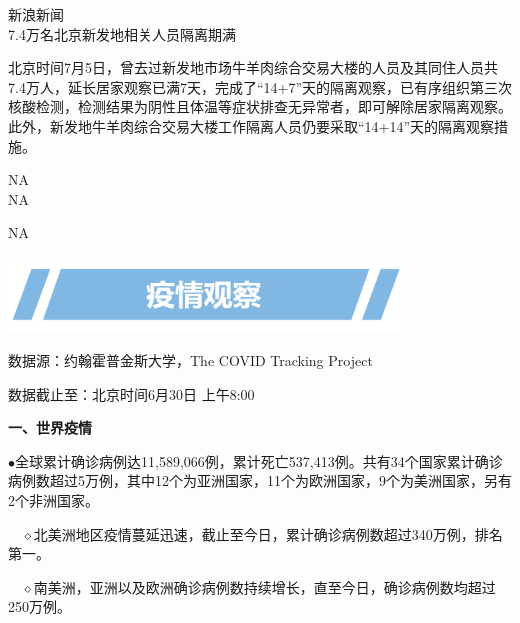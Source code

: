 \documentclass[
]{article}
\begin{document}
\vspace{-3mm}

\begin{center}
\textcolor{glaucous}{新浪新闻}\\7.4万名北京新发地相关人员隔离期满
\end{center}

北京时间7月5日，曾去过新发地市场牛羊肉综合交易大楼的人员及其同住人员共7.4万人，延长居家观察已满7天，完成了``14+7''天的隔离观察，已有序组织第三次核酸检测，检测结果为阴性且体温等症状排查无异常者，即可解除居家隔离观察。此外，新发地牛羊肉综合交易大楼工作隔离人员仍要采取``14+14''天的隔离观察措施。

\begin{center}
\textcolor{glaucous}{NA}\\NA
\end{center}

NA

\vspace{10mm}

\begin{center}
\includegraphics[height=2cm]{./input/title2.png} 
\end{center}

\begin{Large}
\vspace{-7mm}
{数据源：约翰霍普金斯大学，The COVID Tracking  Project}
\end{Large}

\vspace{-7mm}

\begin{Large}
{数据截止至：北京时间6月30日 上午8:00}
\end{Large}

\begin{huge}{\textcolor{glaucous}{\textbf {一、世界疫情}}}\end{huge}

\(\bullet\)全球累计确诊病例达11,589,066例，累计死亡537,413例。共有34个国家累计确诊病例数超过5万例，其中12个为亚洲国家，11个为欧洲国家，9个为美洲国家，另有2个非洲国家。

\(\quad\)\(\diamond\)北美洲地区疫情蔓延迅速，截止至今日，累计确诊病例数超过340万例，排名第一。

\(\quad\)\(\diamond\)南美洲，亚洲以及欧洲确诊病例数持续增长，直至今日，确诊病例数均超过250万例。
\end{document}
